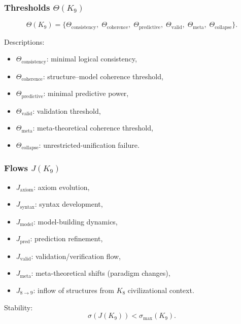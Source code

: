 \subsubsection{Thresholds \texorpdfstring{$\Theta(K_9)$}{\Theta(K_9)}}

\[
\Theta(K_9)=
\{
\Theta_{\mathrm{consistency}},\;
\Theta_{\mathrm{coherence}},\;
\Theta_{\mathrm{predictive}},\;
\Theta_{\mathrm{valid}},\;
\Theta_{\mathrm{meta}},\;
\Theta_{\mathrm{collapse}}
\}.
\]

Descriptions:
\begin{itemize}
    \item $\Theta_{\mathrm{consistency}}$: minimal logical consistency,
    \item $\Theta_{\mathrm{coherence}}$: structure–model coherence threshold,
    \item $\Theta_{\mathrm{predictive}}$: minimal predictive power,
    \item $\Theta_{\mathrm{valid}}$: validation threshold,
    \item $\Theta_{\mathrm{meta}}$: meta-theoretical coherence threshold,
    \item $\Theta_{\mathrm{collapse}}$: unrestricted-unification failure.
\end{itemize}

\subsubsection{Flows \texorpdfstring{$J(K_9)$}{J(K_9)}}

\begin{itemize}
    \item $J_{\mathrm{axiom}}$: axiom evolution,
    \item $J_{\mathrm{syntax}}$: syntax development,
    \item $J_{\mathrm{model}}$: model-building dynamics,
    \item $J_{\mathrm{pred}}$: prediction refinement,
    \item $J_{\mathrm{valid}}$: validation/verification flow,
    \item $J_{\mathrm{meta}}$: meta-theoretical shifts (paradigm changes),
    \item $J_{8\to9}$: inflow of structures from $K_8$ civilizational context.
\end{itemize}

Stability:
\[
\sigma(J(K_9)) < \sigma_{\max}(K_9).
\]

